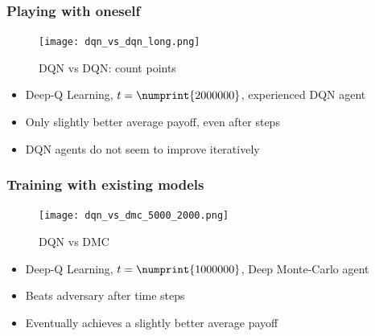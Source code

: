 
\begin{frame}
\frametitle{Playing with oneself}

\begin{figure}
\texttt{[image: dqn\_vs\_dqn\_long.png]}
\caption{DQN vs DQN: count points}
\end{figure}

\begin{itemize}
\item Deep-Q Learning, $t = \numprint{2000000}$, experienced DQN agent
\item Only slightly better average payoff, even after  steps
\item DQN agents do not seem to improve iteratively
\end{itemize}
\end{frame}


\begin{frame}
\frametitle{Training with existing models}

\begin{figure}
\texttt{[image: dqn\_vs\_dmc\_5000\_2000.png]}
\caption{DQN vs DMC}
\end{figure}

\begin{itemize}
\item Deep-Q Learning, $t = \numprint{1000000}$, Deep Monte-Carlo agent
\item Beats adversary after  time steps
\item Eventually achieves a slightly better average payoff
\end{itemize}
\end{frame}